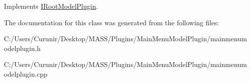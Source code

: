 Implements \hyperlink{class_i_root_model_plugin_a9ee55034608480fda71b7700d3495984}{I\+Root\+Model\+Plugin}.



The documentation for this class was generated from the following files\+:\begin{DoxyCompactItemize}
\item 
C\+:/\+Users/\+Curunir/\+Desktop/\+M\+A\+S\+S/\+Plugins/\+Main\+Menu\+Model\+Plugin/mainmenumodelplugin.\+h\item 
C\+:/\+Users/\+Curunir/\+Desktop/\+M\+A\+S\+S/\+Plugins/\+Main\+Menu\+Model\+Plugin/mainmenumodelplugin.\+cpp\end{DoxyCompactItemize}
